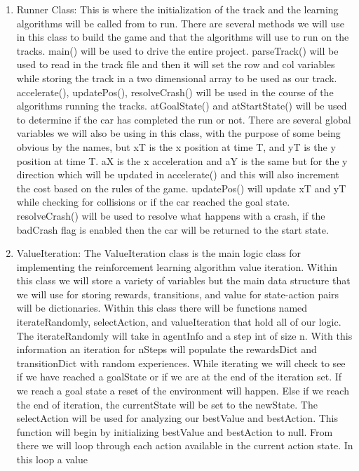\documentclass{article}
\begin{document}
\begin{enumerate}
    \item Runner Class: This is where the initialization of the track and the learning algorithms will be called from to run. 
    There are several methods we will use in this class to build the game and that the algorithms will use to run on the tracks. 
    main() will be used to drive the entire project. parseTrack() will be used to read in the track file and then it will set the 
    row and col variables while storing the track in a two dimensional array to be used as our track. accelerate(), updatePos(), 
    resolveCrash() will be used in the course of the algorithms running the tracks. atGoalState() and atStartState() will be used to determine 
    if the car has completed the run or not. There are several global variables we will also be using in this class, with the purpose of some 
    being obvious by the names, but xT is the x position at time T, and yT is the y position at time T. aX is the x acceleration and aY is 
    the same but for the y direction which will be updated in accelerate() and this will also increment the cost based on the rules of the 
    game. updatePos() will update xT and yT while checking for collisions or if the car reached the goal state. resolveCrash() will be used 
    to resolve what happens with a crash, if the badCrash flag is enabled then the car will be returned to the start state. 
    \item ValueIteration: The ValueIteration class is the main logic class for implementing the reinforcement learning algorithm value iteration. 
    Within this class we will store a variety of variables but the main data structure that we will use for storing rewards, transitions, 
    and value for state-action pairs will be dictionaries. Within this class there will be functions named iterateRandomly, selectAction, 
    and valueIteration that hold all of our logic. The iterateRandomly will take in agentInfo and a step int of size n. With this 
    information an iteration for nSteps will populate the rewardsDict and transitionDict with random experiences. While iterating we 
    will check to see if we have reached a goalState or if we are at the end of the iteration set. If we reach a goal state a reset 
    of the environment will happen. Else if we reach the end of iteration, the currentState will be set to the newState. 
    The selectAction will be used for analyzing our bestValue and bestAction. This function will begin by initializing bestValue 
    and bestAction to null. From there we will loop through each action available in the current action state. In this loop a value 

\end{enumerate}
\end{document}
